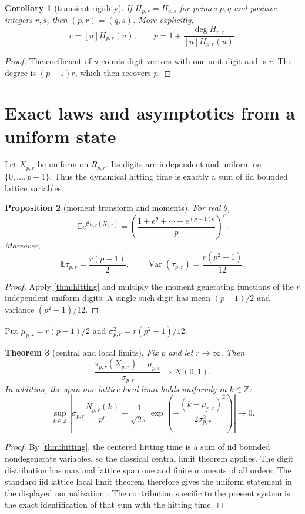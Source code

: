 \documentclass[11pt,a4paper]{amsart}
\newtheorem{theorem}{Theorem}[section]
\newtheorem{proposition}[theorem]{Proposition}
\newtheorem{corollary}[theorem]{Corollary}
\theoremstyle{definition}
\theoremstyle{remark}
\newcommand{\Z}{\mathbb Z}
\newcommand{\E}{\mathbb E}
\newcommand{\Var}{\operatorname{Var}}
\begin{document}
\begin{corollary}[transient rigidity]\label{cor:rigidity}
If $H_{p,r}=H_{q,s}$ for primes $p,q$ and positive integers $r,s$, then
$(p,r)=(q,s)$.  More explicitly,
\[
 r=[u]H_{p,r}(u),
 \qquad
 p=1+\frac{\deg H_{p,r}}{[u]H_{p,r}(u)}.
\]
\end{corollary}

\begin{proof}
The coefficient of $u$ counts digit vectors with one unit digit and is
$r$.  The degree is $(p-1)r$, which then recovers $p$.
\end{proof}

\section{Exact laws and asymptotics from a uniform state}

Let $X_{p,r}$ be uniform on $R_{p,r}$.  Its digits are independent and
uniform on $\{0,\ldots,p-1\}$.  Thus the dynamical hitting time is exactly a
sum of iid bounded lattice variables.

\begin{proposition}[moment transform and moments]\label{prop:moments}
For real $\theta$,
\[
 \E e^{\theta\tau_{p,r}(X_{p,r})}
 =\left(\frac{1+e^\theta+\cdots+e^{(p-1)\theta}}p\right)^r.
\]
Moreover,
\[
 \boxed{\E\tau_{p,r}=\frac{r(p-1)}2,\qquad
 \Var(\tau_{p,r})=\frac{r(p^2-1)}{12}.}
\]
\end{proposition}

\begin{proof}
Apply \cref{thm:hitting} and multiply the moment generating functions of the
$r$ independent uniform digits.  A single such digit has mean $(p-1)/2$ and
variance $(p^2-1)/12$.
\end{proof}

Put $\mu_{p,r}=r(p-1)/2$ and
$\sigma_{p,r}^2=r(p^2-1)/12$.

\begin{theorem}[central and local limits]\label{thm:limits}
Fix $p$ and let $r\to\infty$.  Then
\[
 \frac{\tau_{p,r}(X_{p,r})-\mu_{p,r}}{\sigma_{p,r}}
 \Longrightarrow \mathcal N(0,1).
\]
In addition, the span-one lattice local limit holds uniformly in
$k\in\Z$:
\[
 \sup_{k\in\Z}\left|
 \sigma_{p,r}\frac{N_{p,r}(k)}{p^r}
 -\frac1{\sqrt{2\pi}}
 \exp\!\left(-\frac{(k-\mu_{p,r})^2}{2\sigma_{p,r}^2}\right)
 \right|\longrightarrow0.
\]
\end{theorem}

\begin{proof}
By \cref{thm:hitting}, the centered hitting time is a sum of iid bounded
nondegenerate variables, so the classical central limit theorem applies.
The digit distribution has maximal lattice span one and finite moments of
all orders.  The standard iid lattice local limit theorem therefore gives
the uniform statement in the displayed normalization
\cite[Chapter~VII]{Petrov1975}.  The contribution specific to the present
system is the exact identification of that sum with the hitting time.
\end{proof}
\end{document}
